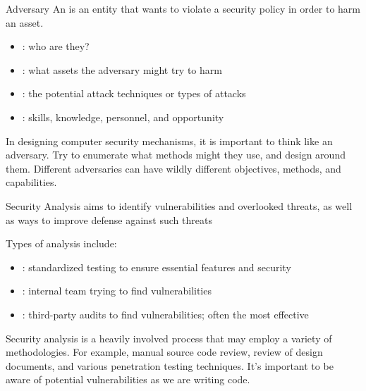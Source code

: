 \documentclass[code]{amznotes}
\begin{document}
\begin{dfnbox}{Adversary}{}
    An  is an entity that wants to violate a security policy in order to harm an asset.
    \begin{itemize}[noitemsep]
        \item {}: who are they?
        \item {}: what assets the adversary might try to harm
        \item {}: the potential attack techniques or types of attacks
        \item {}: skills, knowledge, personnel, and opportunity
    \end{itemize}
\end{dfnbox}

In designing computer security mechanisms, it is important to think like an adversary. Try to enumerate what methods might they use, and design around them. Different adversaries can have wildly different objectives, methods, and capabilities.

\begin{dfnbox}{Security Analysis}{}
     aims to identify vulnerabilities and overlooked threats, as well as ways to improve defense against such threats
\end{dfnbox}

Types of analysis include:
\begin{itemize}[noitemsep]
    \item {}: standardized testing to ensure essential features and security
    \item {}: internal team trying to find vulnerabilities
    \item {}: third-party audits to find vulnerabilities; often the most effective
\end{itemize}

Security analysis is a heavily involved process that may employ a variety of methodologies. For example, manual source code review, review of design documents, and various penetration testing techniques. It's important to be aware of potential vulnerabilities as we are writing code.
\end{document}
